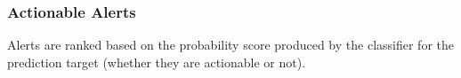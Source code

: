 
\subsubsection{Actionable Alerts}
\label{results:actionable_alerts}

Alerts are ranked based on the probability score produced by the classifier for the prediction target (whether they are actionable or not). 

